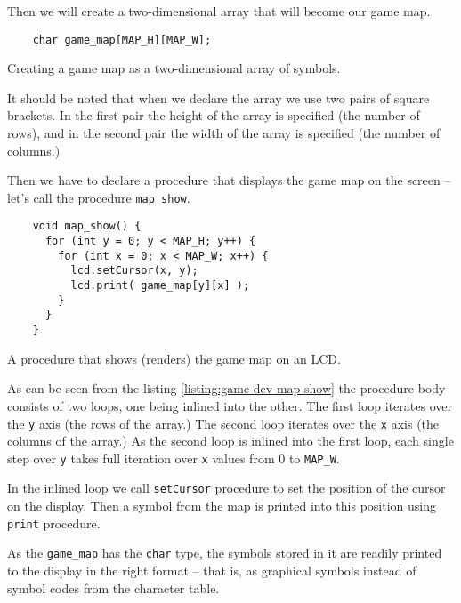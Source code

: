 \documentclass[../sparc.tex]{subfiles}
\begin{document}
Then we will create a two-dimensional array that will become our game map.

\begin{listing}[H]
  \begin{verbatim}
    char game_map[MAP_H][MAP_W];
  \end{verbatim}
  \caption{Creating a game map as a two-dimensional array of symbols.}
  \label{listing:game-dev-map-array}
\end{listing}

It should be noted that when we declare the array we use two pairs of square
brackets.  In the first pair the height of the array is specified (the number of
rows), and in the second pair the width of the array is specified (the number of
columns.)

Then we have to declare a procedure that displays the game map on the screen --
let's call the procedure \texttt{map_show}.

\begin{listing}[ht]
  \begin{verbatim}
    void map_show() {
      for (int y = 0; y < MAP_H; y++) {
        for (int x = 0; x < MAP_W; x++) {
          lcd.setCursor(x, y);
          lcd.print( game_map[y][x] );
        }
      }
    }
  \end{verbatim}
  \caption{A procedure that shows (renders) the game map on an LCD.}
  \label{listing:game-dev-map-show}
\end{listing}

As can be seen from the listing \ref{listing:game-dev-map-show} the procedure
body consists of two loops, one being inlined into the other.  The first loop
iterates over the \texttt{y} axis (the rows of the array.)  The second
loop iterates over the \texttt{x} axis (the columns of the array.)  As
the second loop is inlined into the first loop, each single step over
\texttt{y} takes full iteration over \texttt{x} values from 0
to \texttt{MAP_W}.

In the inlined loop we call \texttt{setCursor} procedure to set the
position of the cursor on the display.  Then a symbol from the map is printed
into this position using \texttt{print} procedure.

As the \texttt{game_map} has the \texttt{char} type, the
symbols stored in it are readily printed to the display in the right format --
that is, as graphical symbols instead of symbol codes from the character table.
\end{document}

